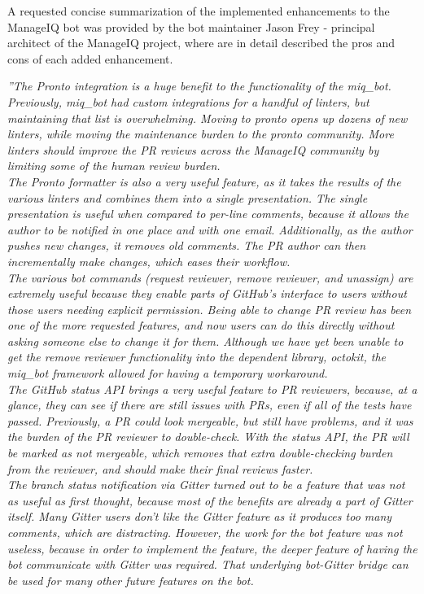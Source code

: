 A requested concise summarization of the implemented enhancements to the ManageIQ bot was provided by the bot maintainer Jason Frey - principal architect of the ManageIQ project, where are in detail described the pros and cons of each added enhancement.

\begin{displayquote}
\textit{
''The Pronto integration is a huge benefit to the functionality of the miq\_bot. Previously, miq\_bot had custom integrations for a handful of linters, but maintaining that list is overwhelming. Moving to pronto opens up dozens of new linters, while moving the maintenance burden to the pronto community. More linters should improve the PR reviews across the ManageIQ community by limiting some of the human review burden.\\[0.5em]
The Pronto formatter is also a very useful feature, as it takes the results of the various linters and combines them into a single presentation. The single presentation is useful when compared to per-line comments, because it allows the author to be notified in one place and with one email. Additionally, as the author pushes new changes, it removes old comments. The PR author can then incrementally make changes, which eases their workflow.\\[0.5em]
The various bot commands (request reviewer, remove reviewer, and unassign) are extremely useful because they enable parts of GitHub’s interface to users without those users needing explicit permission. Being able to change PR review has been one of the more requested features, and now users can do this directly without asking someone else to change it for them. Although we have yet been unable to get the remove reviewer functionality into the dependent library, octokit, the miq\_bot framework allowed for having a temporary workaround.\\[0.5em]
The GitHub status API brings a very useful feature to PR reviewers, because, at a glance, they can see if there are still issues with PRs, even if all of the tests have passed. Previously, a PR could look mergeable, but still have problems, and it was the burden of the PR reviewer to double-check. With the status API, the PR will be marked as not mergeable, which removes that extra double-checking burden from the reviewer, and should make their final reviews faster.\\[0.5em]
The branch status notification via Gitter turned out to be a feature that was not as useful as first thought, because most of the benefits are already a part of Gitter itself. Many Gitter users don’t like the Gitter feature as it produces too many comments, which are distracting. However, the work for the bot feature was not useless, because in order to implement the feature, the deeper feature of having the bot communicate with Gitter was required. That underlying bot-Gitter bridge can be used for many other future features on the bot.\\[0.5em]
}
\end{displayquote}
